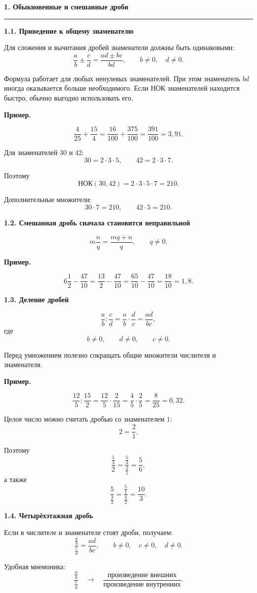 \documentclass[a4paper,12pt]{article}
\newcommand{\topic}[1]{%
  \vspace{0.3em}
  {\Large\bfseries\textcolor{darkaccent}{#1}}\par
  \vspace{0.3em}
  \noindent\textcolor{accent}{\rule{\linewidth}{0.7pt}}\par
  \vspace{0.5em}
}
\newcommand{\subtopic}[1]{%
  \vspace{0.6em}
  {\large\bfseries\textcolor{darkaccent}{#1}}\par
  \vspace{0.15em}
}
\newcommand{\important}[1]{%
  \textbf{\textcolor{darkaccent}{#1}}%
}
\begin{document}
\topic{1. Обыкновенные и смешанные дроби}

\subtopic{1.1. Приведение к общему знаменателю}

Для сложения и вычитания дробей знаменатели должны быть одинаковыми:
\[
\frac{a}{b}\pm\frac{c}{d}
=
\frac{ad\pm bc}{bd},
\qquad
b\ne0,\quad d\ne0.
\]

Формула работает для любых ненулевых знаменателей. При этом знаменатель
\(bd\) иногда оказывается больше необходимого. Если НОК знаменателей
находится быстро, обычно выгодно использовать его.

\important{Пример.}
\[
\frac{4}{25}+\frac{15}{4}
=
\frac{16}{100}+\frac{375}{100}
=
\frac{391}{100}
=
3{,}91.
\]

Для знаменателей \(30\) и \(42\):
\[
30=2\cdot3\cdot5,
\qquad
42=2\cdot3\cdot7.
\]

Поэтому
\[
\text{НОК}(30,42)
=
2\cdot3\cdot5\cdot7
=
210.
\]

Дополнительные множители:
\[
30\cdot7=210,
\qquad
42\cdot5=210.
\]

\subtopic{1.2. Смешанная дробь сначала становится неправильной}

\[
m\frac{n}{q}
=
\frac{mq+n}{q},
\qquad
q\ne0.
\]

\important{Пример.}
\[
6\frac12-\frac{47}{10}
=
\frac{13}{2}-\frac{47}{10}
=
\frac{65}{10}-\frac{47}{10}
=
\frac{18}{10}
=
1{,}8.
\]

\subtopic{1.3. Деление дробей}

\[
\frac{a}{b}:\frac{c}{d}
=
\frac{a}{b}\cdot\frac{d}{c}
=
\frac{ad}{bc},
\]
где
\[
b\ne0,
\qquad
d\ne0,
\qquad
c\ne0.
\]

Перед умножением полезно сокращать общие множители числителя
и знаменателя.

\important{Пример.}
\[
\frac{12}{5}:\frac{15}{2}
=
\frac{12}{5}\cdot\frac{2}{15}
=
\frac{4}{5}\cdot\frac{2}{5}
=
\frac{8}{25}
=
0{,}32.
\]

Целое число можно считать дробью со знаменателем \(1\):
\[
2=\frac21.
\]

Поэтому
\[
\frac{\frac53}{2}
=
\frac{\frac53}{\frac21}
=
\frac56,
\]
а также
\[
\frac{5}{\frac32}
=
\frac{\frac51}{\frac32}
=
\frac{10}{3}.
\]

\subtopic{1.4. Четырёхэтажная дробь}

Если в числителе и знаменателе стоят дроби, получаем:
\[
\frac{\frac{a}{b}}{\frac{c}{d}}
=
\frac{ad}{bc},
\qquad
b\ne0,\quad c\ne0,\quad d\ne0.
\]

Удобная мнемоника:
\[
\frac{\frac{a}{b}}{\frac{c}{d}}
\quad\longrightarrow\quad
\frac{\text{произведение внешних}}
     {\text{произведение внутренних}}.
\]
\end{document}
